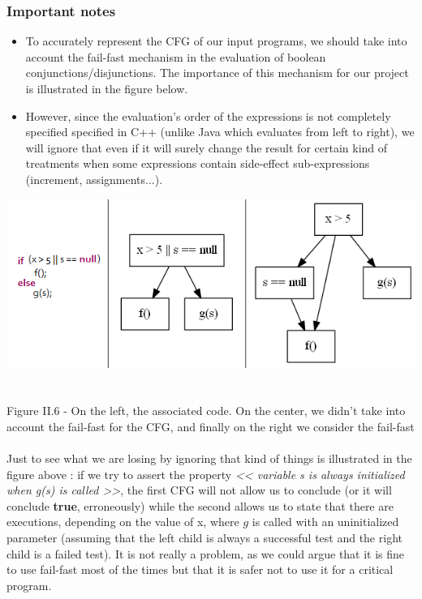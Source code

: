 \documentclass{report}
\begin{document}
\subsubsection{Important notes}

\vspace{1.5mm}
\begin{itemize}
\item To accurately represent the CFG of our input programs, we should take into account the fail-fast mechanism in the evaluation of boolean conjunctions/disjunctions.
The importance of this mechanism for our project is illustrated in the figure below.\vspace{1mm}
\item However, since the evaluation's order of the expressions is not completely specified specified in C++ (unlike Java which evaluates from left to right),
we will ignore that even if it will surely change the result for certain kind of treatments when some expressions contain side-effect sub-expressions
 (increment, assignments...).\vspace{1mm}
\end{itemize}

\begin{center}
\includegraphics[scale=0.7]{data/fail-fast}
~\\~\\Figure II.6 - On the left, the associated code. On the center, we didn't take into account the fail-fast for the CFG, and finally on the right we consider the fail-fast
\end{center}

\paragraph{}
\hspace{4mm}Just to see what we are losing by ignoring that kind of things is illustrated in the figure above : if we try to
assert the property \textit {<< variable s is always initialized when g(s) is called >>}, the first CFG will not allow us to conclude
(or it will conclude \textbf {true}, erroneously) while the second allows us
to state that there are executions, depending on the value of x,
where $g$ is called with an uninitialized parameter
(assuming that the left child is always a successful test and the right child is a failed test). It is not really a problem, as
we could argue that it is fine to use fail-fast most of the times but that it is safer not to use it for a critical program.
\end{document}
